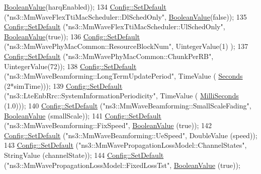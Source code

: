 \begin{DoxyCode}
      \hyperlink{classns3_1_1BooleanValue}{BooleanValue}(harqEnabled));
134         \hyperlink{group__config_ga2e7882df849d8ba4aaad31c934c40c06}{Config::SetDefault} (\textcolor{stringliteral}{"ns3::MmWaveFlexTtiMacScheduler::DlSchedOnly"}, 
      \hyperlink{classns3_1_1BooleanValue}{BooleanValue}(\textcolor{keyword}{false}));
135         \hyperlink{group__config_ga2e7882df849d8ba4aaad31c934c40c06}{Config::SetDefault} (\textcolor{stringliteral}{"ns3::MmWaveFlexTtiMacScheduler::UlSchedOnly"}, 
      \hyperlink{classns3_1_1BooleanValue}{BooleanValue}(\textcolor{keyword}{true}));
136         \hyperlink{group__config_ga2e7882df849d8ba4aaad31c934c40c06}{Config::SetDefault} (\textcolor{stringliteral}{"ns3::MmWavePhyMacCommon::ResourceBlockNum"}, UintegerValue(1)
      );
137         \hyperlink{group__config_ga2e7882df849d8ba4aaad31c934c40c06}{Config::SetDefault} (\textcolor{stringliteral}{"ns3::MmWavePhyMacCommon::ChunkPerRB"}, UintegerValue(72));
138         \hyperlink{group__config_ga2e7882df849d8ba4aaad31c934c40c06}{Config::SetDefault} (\textcolor{stringliteral}{"ns3::MmWaveBeamforming::LongTermUpdatePeriod"}, TimeValue (
      \hyperlink{group__timecivil_ga33c34b816f8ff6628e33d5c8e9713b9e}{Seconds} (2*simTime)));
139         \hyperlink{group__config_ga2e7882df849d8ba4aaad31c934c40c06}{Config::SetDefault} (\textcolor{stringliteral}{"ns3::LteEnbRrc::SystemInformationPeriodicity"}, TimeValue (
      \hyperlink{group__timecivil_gaf26127cf4571146b83a92ee18679c7a9}{MilliSeconds} (1.0)));
140         \hyperlink{group__config_ga2e7882df849d8ba4aaad31c934c40c06}{Config::SetDefault} (\textcolor{stringliteral}{"ns3::MmWaveBeamforming::SmallScaleFading"}, 
      \hyperlink{classns3_1_1BooleanValue}{BooleanValue} (smallScale));
141         \hyperlink{group__config_ga2e7882df849d8ba4aaad31c934c40c06}{Config::SetDefault} (\textcolor{stringliteral}{"ns3::MmWaveBeamforming::FixSpeed"}, 
      \hyperlink{classns3_1_1BooleanValue}{BooleanValue} (\textcolor{keyword}{true}));
142         \hyperlink{group__config_ga2e7882df849d8ba4aaad31c934c40c06}{Config::SetDefault} (\textcolor{stringliteral}{"ns3::MmWaveBeamforming::UeSpeed"}, DoubleValue (speed));
143         \hyperlink{group__config_ga2e7882df849d8ba4aaad31c934c40c06}{Config::SetDefault} (\textcolor{stringliteral}{"ns3::MmWavePropagationLossModel::ChannelStates"}, StringValue
       (channelState));
144         \hyperlink{group__config_ga2e7882df849d8ba4aaad31c934c40c06}{Config::SetDefault} (\textcolor{stringliteral}{"ns3::MmWavePropagationLossModel::FixedLossTst"}, 
      \hyperlink{classns3_1_1BooleanValue}{BooleanValue} (\textcolor{keyword}{true}));

\end{DoxyCode}

